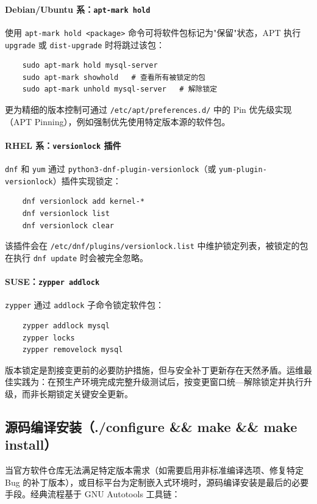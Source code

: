\documentclass[12pt,UTF8]{ctexbook}
\begin{document}
\paragraph{Debian/Ubuntu 系：\texttt{apt-mark hold}}
使用 \verb|apt-mark hold <package>| 命令可将软件包标记为"保留"状态，APT 执行 \texttt{upgrade} 或 \texttt{dist-upgrade} 时将跳过该包：
\begin{verbatim}
	sudo apt-mark hold mysql-server
	sudo apt-mark showhold   # 查看所有被锁定的包
	sudo apt-mark unhold mysql-server   # 解除锁定
\end{verbatim}
更为精细的版本控制可通过 \texttt{/etc/apt/preferences.d/} 中的 Pin 优先级实现（APT Pinning），例如强制优先使用特定版本源的软件包。

\paragraph{RHEL 系：\texttt{versionlock} 插件}
\texttt{dnf} 和 \texttt{yum} 通过 \texttt{python3-dnf-plugin-versionlock}（或 \texttt{yum-plugin-versionlock}）插件实现锁定：
\begin{verbatim}
	dnf versionlock add kernel-*
	dnf versionlock list
	dnf versionlock clear
\end{verbatim}
该插件会在 \texttt{/etc/dnf/plugins/versionlock.list} 中维护锁定列表，被锁定的包在执行 \texttt{dnf update} 时会被完全忽略。

\paragraph{SUSE：\texttt{zypper addlock}}
\texttt{zypper} 通过 \texttt{addlock} 子命令锁定软件包：
\begin{verbatim}
	zypper addlock mysql
	zypper locks
	zypper removelock mysql
\end{verbatim}

版本锁定是割接变更前的必要防护措施，但与安全补丁更新存在天然矛盾。运维最佳实践为：在预生产环境完成完整升级测试后，按变更窗口统—解除锁定并执行升级，而非长期锁定关键安全更新。

\subsection{源码编译安装（./configure \&\& make \&\& make install）}

当官方软件仓库无法满足特定版本需求（如需要启用非标准编译选项、修复特定 Bug 的补丁版本），或目标平台为定制嵌入式环境时，源码编译安装是最后的必要手段。经典流程基于 GNU Autotools 工具链：
\end{document}
